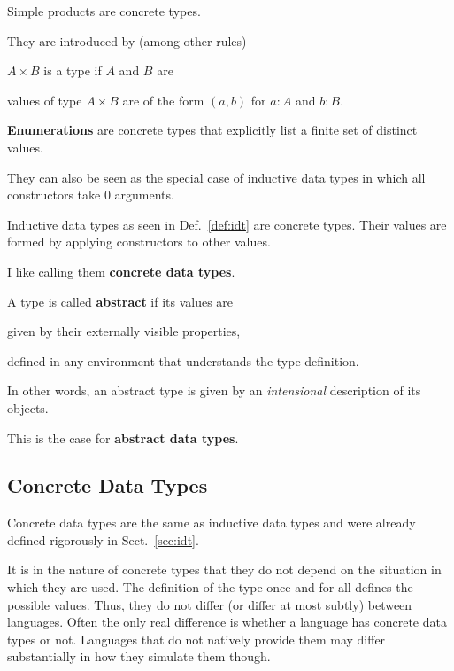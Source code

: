 \begin{example}
Simple products are concrete types.

They are introduced by (among other rules)
\begin{compactitem}
 \item $A\times B$ is a type if $A$ and $B$ are
 \item values of type $A\times B$ are of the form $(a,b)$ for $a:A$ and $b:B$.
\end{compactitem}
\end{example}

\begin{example}
\textbf{Enumerations} are concrete types that explicitly list a finite set of distinct values.

They can also be seen as the special case of inductive data types in which all constructors take $0$ arguments.
\end{example}

\begin{example}
Inductive data types as seen in Def.~\ref{def:idt} are concrete types.
Their values are formed by applying constructors to other values.

I like calling them \textbf{concrete data types}.
\end{example}

A type is called \textbf{abstract} if its values are
\begin{compactitem}
\item given by their externally visible properties,
\item defined in any environment that understands the type definition.
\end{compactitem}
In other words, an abstract type is given by an \emph{intensional} description of its objects.

This is the case for \textbf{abstract data types}.

\subsection{Concrete Data Types}

Concrete data types are the same as inductive data types and were already defined rigorously in Sect.~\ref{sec:idt}.

It is in the nature of concrete types that they do not depend on the situation in which they are used.
The definition of the type once and for all defines the possible values.
Thus, they do not differ (or differ at most subtly) between languages.
Often the only real difference is whether a language has concrete data types or not.
Languages that do not natively provide them may differ substantially in how they simulate them though.

